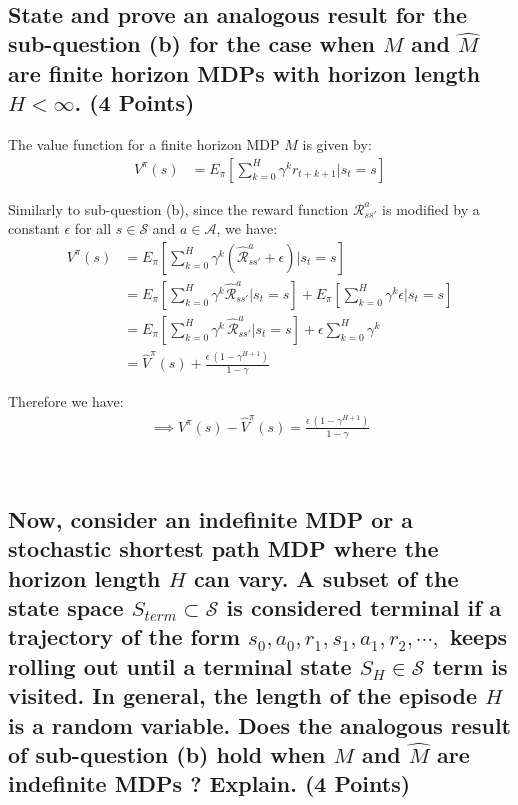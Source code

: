\documentclass{article}
\renewcommand{\S}{\mathcal{S}}
\newcommand{\A}{\mathcal{A}}
\newcommand{\R}{\mathcal{R}}
\newcommand{\Rhat}{\hat{\mathcal{R}}}
\begin{document}
\,

\subsection{State and prove an analogous result for the sub-question (b) for the case when $M$ and $\hat{M}$ are finite horizon MDPs with horizon length $H < \infty$. (4 Points)}

The value function for a finite horizon MDP $M$ is given by:
\begin{align}
	V^\pi(s) &= E_\pi \left[ \sum_{k=0}^{H} \gamma^k r_{t+k+1} \bigg| s_t = s \right]
\end{align}

\noindent
Similarly to sub-question (b), since the reward function $\R^a_{ss'}$ is modified by a constant $\epsilon$ for all $s \in \S$ and $a \in \A$, we have:
\begin{align}
	V^\pi(s) &= E_\pi \left[ \sum_{k=0}^{H} \gamma^k \left( \Rhat^a_{ss'} + \epsilon \right) \bigg| s_t = s \right] \\
	&= E_\pi \left[ \sum_{k=0}^{H} \gamma^k \Rhat^a_{ss'} \bigg| s_t = s \right] + E_\pi \left[ \sum_{k=0}^{H} \gamma^k \epsilon \bigg| s_t = s \right] \\
	&= E_\pi \left[ \sum_{k=0}^{H} \gamma^k \, \Rhat^a_{ss'} \bigg| s_t = s \right] + \epsilon \sum_{k=0}^{H} \gamma^k \\
	&= \hat{V}^\pi(s) + \frac{\epsilon \, (1 - \gamma^{H+1})}{1 - \gamma}
\end{align}

\noindent
Therefore we have:
\begin{align}
	\boxed{\implies V^\pi(s) - \hat{V}^\pi(s) = \frac{\epsilon \, (1 - \gamma^{H+1})}{1 - \gamma}}
\end{align}

\,

\subsection{Now, consider an indefinite MDP or a stochastic shortest path MDP where the horizon length $H$ can vary. A subset of the state space $S_{term} \subset \S$ is considered terminal if a trajectory of the form $s_0, a_0, r_1, s_1, a_1, r_2, \cdots,$ keeps rolling out until a terminal state $S_H \in \S$ term is visited. In general, the length of the episode $H$ is a random variable. Does the analogous result of sub-question (b) hold when $M$ and $\hat{M}$ are indefinite MDPs ? Explain. (4 Points)}
\end{document}

